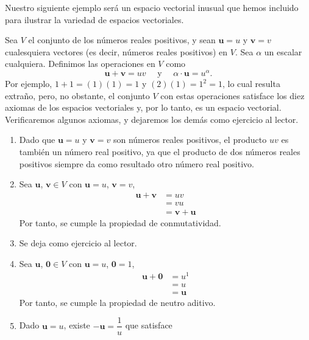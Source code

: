 \newpage

Nuestro siguiente ejemplo será un espacio vectorial inusual que hemos incluido para ilustrar la variedad de espacios vectoriales.

\begin{examplebox}{}{}
    Sea $V$ el conjunto de los números reales positivos, y sean $\mathbf{u} = u$ y $\mathbf{v} = v$ cualesquiera vectores (es decir, números reales positivos) en $V$. Sea $\alpha$ un escalar cualquiera. Definimos las operaciones en $V$ como
    $$\mathbf{u} + \mathbf{v} = uv \quad \text{ y } \quad \alpha \cdot \mathbf{u} = u^{\alpha}.$$
    Por ejemplo, $1 + 1 = (1)(1) = 1$ y $(2)(1) = 1^2 = 1$, lo cual resulta extraño, pero, no obstante, el conjunto $V$ con estas operaciones satisface los diez axiomas de los espacios vectoriales y, por lo tanto, es un espacio vectorial. Verificaremos algunos axiomas, y dejaremos los demás como ejercicio al lector.
    \begin{enumerate}[label=\roman*), topsep=6pt, itemsep=0pt]
        \item Dado que $\mathbf{u} = u$ y $\mathbf{v} = v$ son números reales positivos, el producto $uv$ es también un número real positivo, ya que el producto de dos números reales positivos siempre da como resultado otro número real positivo.
        \item Sea $\mathbf{u}$, $\mathbf{v} \in V$ con $\mathbf{u} = u$, $\mathbf{v} = v$,
        \begin{align*}
            \mathbf{u} + \mathbf{v} & = uv \\
            & = vu \\
            & = \mathbf{v} + \mathbf{u}
        \end{align*}
        Por tanto, se cumple la propiedad de conmutatividad.
        \item Se deja como ejercicio al lector.
        \item Sea $\mathbf{u}$, $\mathbf{0} \in V$ con $\mathbf{u} = u$, $\mathbf{0} = 1$,
        \begin{align*}
            \mathbf{u} + \mathbf{0} & = u^1 \\
            & = u \\
            & = \mathbf{u}
        \end{align*}
        Por tanto, se cumple la propiedad de neutro aditivo.
        \item Dado $\mathbf{u} = u$, existe $-\mathbf{u} = \dfrac{1}{u}$ que satisface
        \begin{align*}

\end{align*}
\end{enumerate}
\end{examplebox}
